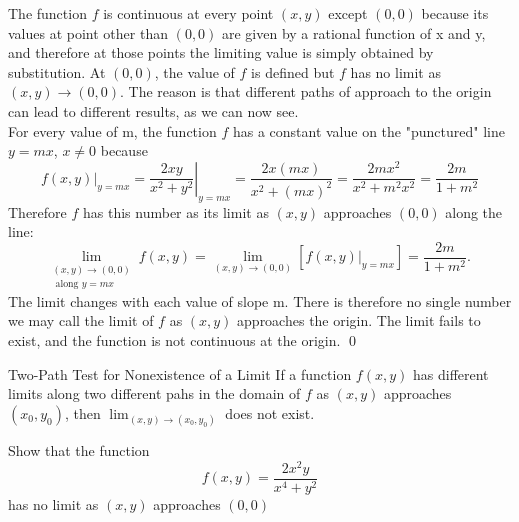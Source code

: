 \documentclass[12pt,a4paper,draft]{article}
\newenvironment{ruleBox}[1]{\begin{rulebox}{#1}}{\end{rulebox}\vspace{1\baselineskip}}
\begin{document}
\begin{solution}
    The function \(f\) is continuous at every point \((x,y)\) except \((0,0)\) because its values at point other than  \((0,0)\) are given by a rational function of x and y, and therefore at those points the limiting value is simply obtained by substitution.
    At \((0,0)\), the value of \(f\) is defined but  \(f\) has no limit as \((x,y) \to (0,0)\). The reason is that different paths of approach to the origin can lead to different results, as we can now see.\\
    For every value of m, the function \(f\) has a constant value on the "punctured" line \(y=mx\), \(x\neq0\) because
    \[\left.f(x, y)\right|_{y=m x}=\left.\frac{2 x y}{x^2+y^2}\right|_{y=m x}=\frac{2 x(m x)}{x^2+(m x)^2}=\frac{2 m x^2}{x^2+m^2 x^2}=\frac{2 m}{1+m^2}\]
    Therefore \(f\) has this number as its limit as \((x,y)\) approaches \((0,0)\) along the line:
    \[\lim _{\substack{(x, y) \rightarrow(0,0) \\ \text { along } y=m x}} f(x, y)=\lim _{(x, y) \rightarrow(0,0)}\left[\left.f(x, y)\right|_{y=m x}\right]=\frac{2 m}{1+m^2} \text {. }\]
    The limit changes with each value of slope m. There is therefore no single number we may call the limit of \(f\) as \((x,y)\) approaches the origin. The limit fails to exist, and the function is not continuous at the origin. \hfill \qed

\end{solution}

\newpage

\begin{ruleBox}{Two-Path Test for Nonexistence of a Limit}
    If a function \(f(x,y)\) has different limits along two different pahs in the domain of \(f\) as \((x,y)\) approaches \((x_0,y_0)\), then \(\lim_{(x,y) \to (x_0,y_0)}\) does not exist.

\end{ruleBox}

\begin{example}
    Show that the function 
    \[f(x,y) = \frac{2x^2y}{x^4+y^2}\]
    has no limit as \((x,y)\) approaches \((0,0)\)

\end{example}
\end{document}

